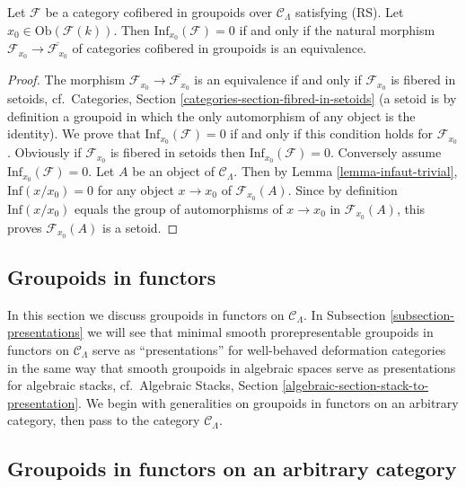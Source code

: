 \begin{lemma}
\label{lemma-infdef-trivial}
Let $\mathcal{F}$ be a category cofibered in groupoids over $\mathcal 
C_\Lambda$ satisfying (RS). Let $x_0 \in \text{Ob}(\mathcal{F}(k))$. 
Then $\text{Inf}_{x_0}(\mathcal{F}) = 0$ if and only if the natural 
morphism $\mathcal{F}_{x_0} \to \overline{\mathcal{F}_{x_0}}$ of 
categories cofibered in groupoids is an equivalence.
\end{lemma}

\begin{proof}
The morphism $\mathcal{F}_{x_0} \to \overline{\mathcal{F}_{x_0}}$ is an 
equivalence if and only if $\mathcal{F}_{x_0}$ is fibered in setoids,
cf.\ Categories, Section \ref{categories-section-fibred-in-setoids}
(a setoid is by definition a groupoid in 
which the only automorphism of any object is the identity).  We prove that 
$\text{Inf}_{x_0}(\mathcal{F}) = 0$ if and only if this condition holds 
for $\mathcal{F}_{x_0}$.  Obviously if $\mathcal{F}_{x_0}$ is fibered in setoids 
then $\text{Inf}_{x_0}(\mathcal{F}) = 0$.  Conversely assume 
$\text{Inf}_{x_0}(\mathcal{F}) = 0$.  Let $A$ be an object of $\mathcal 
C_\Lambda$. Then by Lemma \ref{lemma-infaut-trivial}, 
$\text{Inf}(x/x_0) = 0$ for any object $x \to x_0$ of $\mathcal 
F_{x_0}(A)$. Since by definition $\text{Inf}(x/x_0)$ equals the group of 
automorphisms of $x \to x_0$ in $\mathcal{F}_{x_0}(A)$, this proves 
$\mathcal{F}_{x_0}(A)$ is a setoid.
\end{proof}


\subsection{Groupoids in functors}
\label{subsection-groupoids-in-functors}

\noindent
In this section we discuss groupoids in functors on $\mathcal{C}_\Lambda$. In
Subsection \ref{subsection-presentations}
we will see that minimal smooth 
prorepresentable groupoids in functors on $\mathcal{C}_\Lambda$ serve as 
``presentations'' for well-behaved deformation categories in the same way that 
smooth groupoids in algebraic spaces serve as presentations for algebraic 
stacks,
cf.\ Algebraic Stacks, Section \ref{algebraic-section-stack-to-presentation}.
We begin with generalities 
on groupoids in functors on an arbitrary category, then pass to the category 
$\mathcal{C}_\Lambda$.



\subsection{Groupoids in functors on an arbitrary category}
\label{subsection-groupoids-arbitrary}

